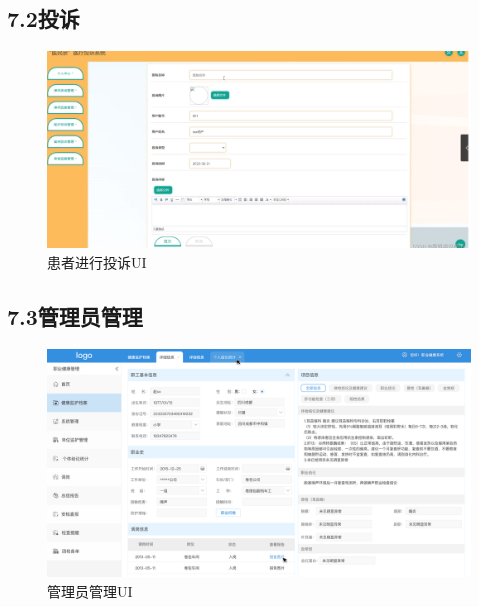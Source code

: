\documentclass[24pt,a4paper]{article}%
\begin{document}
\subsection*{\songti 7.2投诉}
\begin{figure}[H]
	\centering
	\includegraphics[width=1\textwidth]{./image/complaint-1.png}
	\caption*{患者进行投诉UI}
\end{figure}

\subsection*{\songti 7.3管理员管理}
\begin{figure}[H]
	\centering
	\includegraphics[width=1\textwidth]{./image/admin-1.png}
	\caption*{管理员管理UI}
\end{figure}
\end{document}

